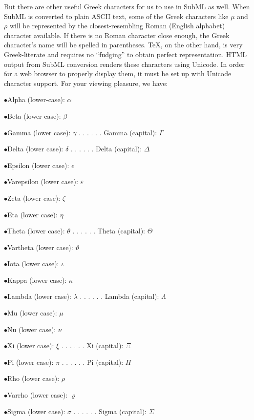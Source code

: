  

But there are other useful Greek characters for us to use in SubML as well.  When SubML is converted to plain ASCII text, some of the Greek characters like $\mu$ and $\rho$ will be represented by the closest-resembling Roman (English alphabet) character available.  If there is no Roman character close enough, the Greek character's name will be spelled in parentheses.  \TeX{}, on the other hand, is very Greek-literate and requires no ``fudging'' to obtain perfect representation.  HTML output from SubML conversion renders these characters using Unicode.  In order for a web browser to properly display them, it must be set up with Unicode character support.  For your viewing pleasure, we have:
 

\medskip 
\item{$\bullet$}Alpha (lower-case): $\alpha$
\item{$\bullet$}Beta (lower case): $\beta$
\item{$\bullet$}Gamma (lower case): $\gamma$ . . . . . . Gamma (capital): $\Gamma$
\item{$\bullet$}Delta (lower case): $\delta$ . . . . . . Delta (capital): $\Delta$
\item{$\bullet$}Epsilon (lower case): $\epsilon$
\item{$\bullet$}Varepsilon (lower case): $\varepsilon$
\item{$\bullet$}Zeta (lower case): $\zeta$
\item{$\bullet$}Eta (lower case): $\eta$
\item{$\bullet$}Theta (lower case): $\theta$ . . . . . . Theta (capital): $\Theta$
\item{$\bullet$}Vartheta (lower case): $\vartheta$
\item{$\bullet$}Iota (lower case): $\iota$
\item{$\bullet$}Kappa (lower case): $\kappa$
\item{$\bullet$}Lambda (lower case): $\lambda$ . . . . . . Lambda (capital): $\Lambda$
\item{$\bullet$}Mu (lower case): $\mu$
\item{$\bullet$}Nu (lower case): $\nu$
\item{$\bullet$}Xi (lower case): $\xi$ . . . . . . Xi (capital): $\Xi$
\item{$\bullet$}Pi (lower case): $\pi$ . . . . . . Pi (capital): $\Pi$
\item{$\bullet$}Rho (lower case): $\rho$
\item{$\bullet$}Varrho (lower case): $\varrho$
\item{$\bullet$}Sigma (lower case): $\sigma$ . . . . . . Sigma (capital): $\Sigma$
